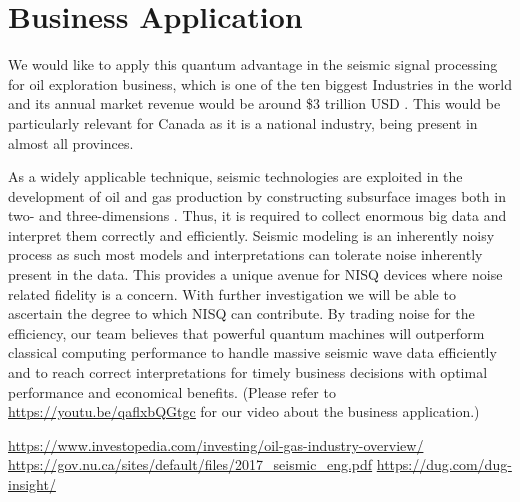 \documentclass[12pt]{article}
\begin{document}
\section*{Business Application}

We would like to apply this quantum advantage in the seismic signal processing for oil exploration business, which is one of the ten biggest Industries in the world and its annual market revenue would be around \$3 trillion USD \cite{oil_industry}. This would be particularly relevant for Canada as it is a national industry, being present in almost all provinces. 

As a widely applicable technique, seismic technologies are exploited in the development of oil and gas production by constructing subsurface images both in two- and three-dimensions \cite{subsurface_img, dug}. Thus, it is required to collect enormous big data and interpret them correctly and efficiently. 
Seismic modeling is an inherently noisy process as such most models and interpretations can tolerate noise inherently present in the data. This provides a unique avenue for NISQ devices where noise related fidelity is a concern. With further investigation we will be able to ascertain the degree to which NISQ can contribute. 
By trading noise for the efficiency, our team believes that powerful quantum machines will outperform classical computing performance to handle massive seismic wave data efficiently and to reach correct interpretations for timely business decisions with optimal performance and economical benefits. (Please refer to \href{https://youtu.be/qaflxbQGtgc}{\underline{https://youtu.be/qaflxbQGtgc}} for our video about the business application.)

\begin{thebibliography}{10}

 \href{https://www.investopedia.com/investing/oil-gas-industry-overview/}{https://www.investopedia.com/investing/oil-gas-industry-overview/}
 \href{https://gov.nu.ca/sites/default/files/2017_seismic_eng.pdf}{https://gov.nu.ca/sites/default/files/2017\_seismic\_eng.pdf}
 \href{https://dug.com/dug-insight/}{https://dug.com/dug-insight/}

\end{thebibliography}
\end{document}
